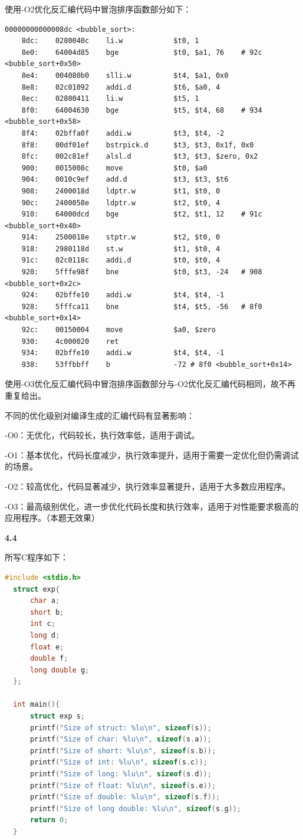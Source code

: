 \documentclass[UTF8]{report}
\begin{document}
  使用-O2优化反汇编代码中冒泡排序函数部分如下：

  \begin{lstlisting}[language=LoongArch]
    00000000000008dc <bubble_sort>:
    8dc:	0280040c 	li.w        	$t0, 1
    8e0:	64004d85 	bge         	$t0, $a1, 76	# 92c <bubble_sort+0x50>
    8e4:	004080b0 	slli.w      	$t4, $a1, 0x0
    8e8:	02c01092 	addi.d      	$t6, $a0, 4
    8ec:	02800411 	li.w        	$t5, 1
    8f0:	64004630 	bge         	$t5, $t4, 68	# 934 <bubble_sort+0x58>
    8f4:	02bffa0f 	addi.w      	$t3, $t4, -2
    8f8:	00df01ef 	bstrpick.d  	$t3, $t3, 0x1f, 0x0
    8fc:	002c81ef 	alsl.d      	$t3, $t3, $zero, 0x2
    900:	0015008c 	move        	$t0, $a0
    904:	0010c9ef 	add.d       	$t3, $t3, $t6
    908:	2400018d 	ldptr.w     	$t1, $t0, 0
    90c:	2400058e 	ldptr.w     	$t2, $t0, 4
    910:	64000dcd 	bge         	$t2, $t1, 12	# 91c <bubble_sort+0x40>
    914:	2500018e 	stptr.w     	$t2, $t0, 0
    918:	2980118d 	st.w        	$t1, $t0, 4
    91c:	02c0118c 	addi.d      	$t0, $t0, 4
    920:	5fffe98f 	bne         	$t0, $t3, -24	# 908 <bubble_sort+0x2c>
    924:	02bffe10 	addi.w      	$t4, $t4, -1
    928:	5fffca11 	bne         	$t4, $t5, -56	# 8f0 <bubble_sort+0x14>
    92c:	00150004 	move        	$a0, $zero
    930:	4c000020 	ret         
    934:	02bffe10 	addi.w      	$t4, $t4, -1
    938:	53ffbbff 	b           	-72	# 8f0 <bubble_sort+0x14>
  \end{lstlisting}
  
  使用-O3优化反汇编代码中冒泡排序函数部分与-O2优化反汇编代码相同，故不再重复给出。

  不同的优化级别对编译生成的汇编代码有显著影响：

  -O0：无优化，代码较长，执行效率低，适用于调试。

  -O1：基本优化，代码长度减少，执行效率提升，适用于需要一定优化但仍需调试的场景。

  -O2：较高优化，代码显著减少，执行效率显著提升，适用于大多数应用程序。

  -O3：最高级别优化，进一步优化代码长度和执行效率，适用于对性能要求极高的应用程序。（本题无效果）
  
\noindent
\textbf{4.4}

所写C程序如下：

\begin{lstlisting}[language=C]
  #include <stdio.h>
  struct exp{
      char a;
      short b;
      int c;
      long d;
      float e;
      double f;
      long double g;
  };
  
  int main(){
      struct exp s;
      printf("Size of struct: %lu\n", sizeof(s));
      printf("Size of char: %lu\n", sizeof(s.a));
      printf("Size of short: %lu\n", sizeof(s.b));
      printf("Size of int: %lu\n", sizeof(s.c));
      printf("Size of long: %lu\n", sizeof(s.d));
      printf("Size of float: %lu\n", sizeof(s.e));
      printf("Size of double: %lu\n", sizeof(s.f));
      printf("Size of long double: %lu\n", sizeof(s.g));
      return 0;
  }
\end{lstlisting}
\end{document}
